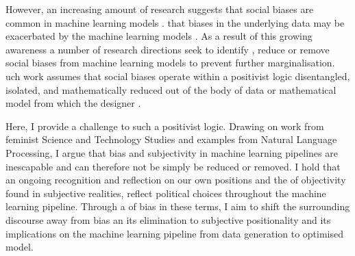 However, an increasing amount of research suggests that social biases are common in machine learning models \citep{Shah:2020,Buolamwini:2018,Agarwal:2018}.
 that biases in the underlying data may be exacerbated by the machine learning models \citep{Zhao:2017,Jia:2020}.
As a result of this growing awareness  a number of research directions seek to identify \citep{Shah:2020,Bender-Friedman:2018,Mitchell:2019,Buolamwini:2018}, reduce or remove social biases \citep{Zhao:2017,Agarwal:2018,Romanov:2019,Jia:2020} from machine learning models to prevent further marginalisation.
uch work assumes that social biases operate within a positivist logic 
 disentangled, isolated, and mathematically reduced out of the body of data or mathematical model from which the designer .

Here, I provide a challenge to such a positivist logic. 
Drawing on work from feminist Science and Technology Studies and examples from Natural Language Processing, I argue that bias and subjectivity in machine learning pipelines are inescapable and can therefore not be simply be reduced or removed.
 I hold that an ongoing recognition and reflection on our own positions and the  of objectivity found in subjective realities, reflect political choices throughout the machine learning pipeline.
Through a  of bias in these terms, I aim to shift the surrounding discourse away from bias an its elimination to subjective positionality and its implications on the machine learning pipeline from data generation to optimised model.

